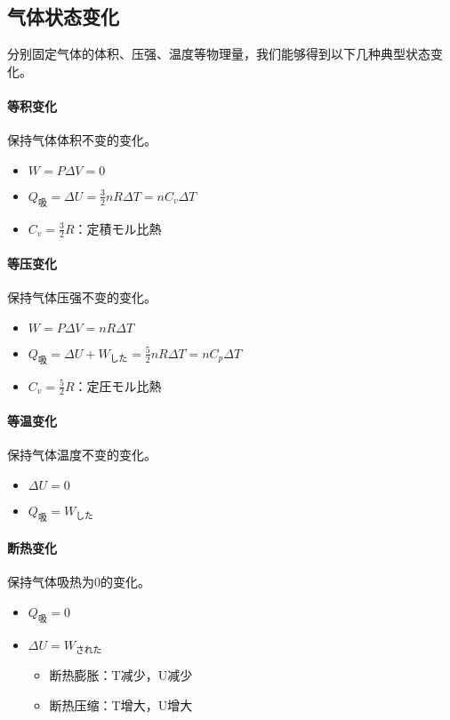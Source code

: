\subsection{气体状态变化}

分别固定气体的体积、压强、温度等物理量，我们能够得到以下几种典型状态变化。

\paragraph{等积变化}保持气体体积不变的变化。
\begin{itemize}
    \item $W=P\Delta V=0$
    \item $Q_\textrm{吸}=\Delta U=\frac32nR\Delta T=nC_v\Delta T$
    \item $C_v=\frac32R$：定積モル比熱
\end{itemize}

\paragraph{等压变化}保持气体压强不变的变化。
\begin{itemize}
    \item $W=P\Delta V=nR\Delta T$
    \item $Q_\textrm{吸}=\Delta U+W_\textrm{した}=\frac52nR\Delta T=nC_p\Delta T$
    \item $C_v=\frac52R$：定圧モル比熱
\end{itemize}

\paragraph{等温变化}保持气体温度不变的变化。
\begin{itemize}
    \item $\Delta U=0$
    \item $Q_\textrm{吸}=W_\textrm{した}$
\end{itemize}

\paragraph{断热变化}保持气体吸热为0的变化。
\begin{itemize}
    \item $Q_\textrm{吸}=0$
    \item $\Delta U=W_\textrm{された}$
    \begin{itemize}
        \item 断热膨胀：T减少，U减少
        \item 断热压缩：T增大，U增大
    \end{itemize}
\end{itemize}

